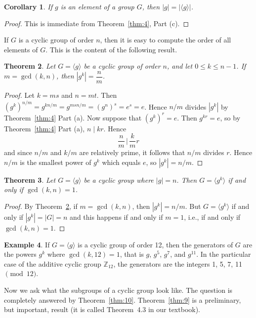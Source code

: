 \documentclass[12pt]{article}
\newcommand{\Z} {{\mathbb Z}}
\newcommand{\order}[1]{\ensuremath{|#1|}}
\newcommand{\divides}{\ensuremath{\mid}}
\newcommand{\<}{\ensuremath{\langle}}
\renewcommand{\>}{\ensuremath{\rangle}}
\newcommand{\eye}{\ensuremath{e}}
\theoremstyle{plain}
\newtheorem{thm}{Theorem}%
\newtheorem{cor}[thm]{Corollary}
\theoremstyle{definition}
\newtheorem{ex}[thm]{Example}
\begin{document}
\begin{cor}    If $g$ is an element of a group $G$, then
$\order{g}=|\langle g\rangle|$.
\end{cor}
\begin{proof}  This is immediate from Theorem~\ref{thm:4}, Part (c).
\end{proof}

If $G$ is a cyclic group  of order $n$,  then it is easy to
compute the order of all elements of $G$.  This is the content of
the following result.

\begin{thm}
\label{thm:6}
  Let $G=\langle g\rangle $ be a cyclic
group of order $n$, and let $0\le k\le n-1$.  If $m=\gcd (k, n)$,
then $\order{g^k}=\dfrac{n}{m}$.
\end{thm}

\begin{proof}  Let $k=ms$ and $n=mt$.  Then
$(g^k)^{n/m}=g^{kn/m}=g^{msn/m}=(g^n)^s=\eye^s=\eye$.  Hence $n/m$
divides $\order{g^k}$ by Theorem~\ref{thm:4} Part (a).  Now suppose that
$(g^k)^r=\eye$.  Then $g^{kr} = \eye$, so by Theorem~\ref{thm:4} Part (a), $n\divides
kr$. Hence $$\frac{n}{ m}\,\Big|\,\frac{k}{ m} r$$ and since $n/m$
and $k/m$ are relatively prime, it follows that $n/m$ divides $r$.
Hence $n/m$ is the smallest power of $g^k$ which equals $\eye$, so
$\order{g^k}=n/m$.
\end{proof}

\begin{thm}  Let $G=\langle g\rangle$ be a cyclic group where
$\order{g}=n$. Then $G=\langle g^k\rangle $ if and only if $\gcd (k, n)
= 1$.
\end{thm}

\begin{proof}  By Theorem~\ref{thm:6},  if $m=\gcd (k, n)$, then $\order{g^k}=n/m$.  But
$G=\langle g^k\rangle $ if and only if $\order{g^k}=|G|=n$ and this
happens if and only if $m=1$, i.e., if and only if $\gcd(k, n)=1$.
\end{proof}

\begin{ex}
  If $G=\langle g\rangle$ is a cyclic group of order 12, then
the generators of $G$ are the powers $g^k$ where $\gcd (k, 12) =
1$, that is $g$, $g^5$, $g^7$, and $g^{11}$.  In the particular
case of the additive cyclic group $\Z_{12}$, the generators are
the integers 1, 5, 7, 11 $\pmod{12}$.
\end{ex}
Now we ask what the subgroups of a  cyclic group look like.  The
question is completely answered by Theorem~\ref{thm:10}.  
Theorem~\ref{thm:9} is a preliminary, but important, result (it is called
Theorem~4.3 in our textbook).
\end{document}

